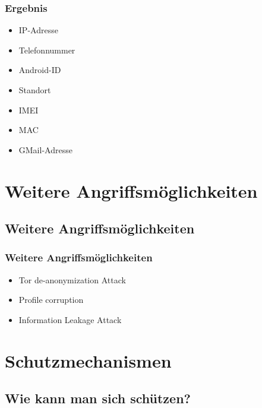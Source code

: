 \documentclass{beamer}
\begin{document}
		
		\begin{frame}\frametitle{Ergebnis}		
		\begin{itemize}
			\item IP-Adresse
			\item Telefonnummer
			\item Android-ID
			\item Standort
			\item IMEI
			\item MAC
			\item GMail-Adresse
		\end{itemize}				
		\end{frame}

\section{Weitere Angriffsmöglichkeiten}
	\subsection*{Weitere Angriffsmöglichkeiten}
	
		\begin{frame}\frametitle{Weitere Angriffsmöglichkeiten}
		\begin{itemize}
			\item Tor de-anonymization Attack
			\item Profile corruption
			\item Information Leakage Attack
		\end{itemize}
		\end{frame}

\section{Schutzmechanismen}
	\subsection*{Wie kann man sich schützen?}
	
\end{document}
